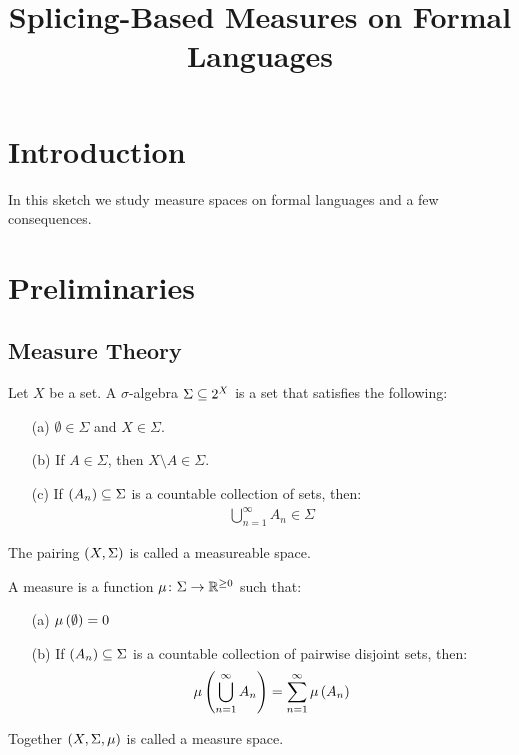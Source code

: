 \documentclass[12pt]{article}
\title{Splicing-Based Measures on Formal Languages}
\date{}
\begin{document}
\maketitle

\section{Introduction}
In this sketch we study
measure spaces on formal languages and a few consequences.

\section{Preliminaries}

\subsection{Measure Theory}
Let \(X\) be a set.
A \(\sigma\)-algebra \(\Sigma \subseteq 2^{X}\) is a set that
satisfies the following:
\begin{enumerate}
  \item[(a)]
    \(\emptyset \in \Sigma\) and \(X \in \Sigma\).

  \item[(b)]
    If \(A \in \Sigma\), then \(X \setminus A \in \Sigma\).

  \item[(c)]
    If \(\left(A_n\right) \subseteq \Sigma\) is a countable collection of sets,
    then:
    \begin{align*}
      \bigcup_{n = 1}^{\infty} A_n \in \Sigma
    \end{align*}

\end{enumerate}
The pairing \(\left(X, \Sigma\right)\) is called a measureable space.

A measure is a function \(\mu \colon \Sigma \to \mathbb{R}^{\geq 0}\) such that:
\begin{enumerate}
  \item[(a)]
    \(\mu\left(\emptyset\right) = 0\)

  \item[(b)]
    If \(\left(A_n\right) \subseteq \Sigma\) is a countable collection
    of pairwise disjoint sets, then:
    \begin{align*}
      \mu\left(\bigcup_{n = 1}^{\infty} A_n\right)
        = \sum_{n = 1}^{\infty} \mu\left(A_n\right)
    \end{align*}
\end{enumerate}
Together \(\left(X, \Sigma, \mu\right)\) is called a measure space.
\end{document}
